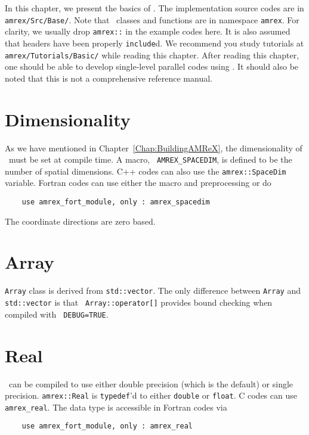 In this chapter, we present the basics of \amrex.  The implementation
source codes are in {\tt amrex/Src/Base/}.  Note that \amrex\ classes
and functions are in namespace {\tt amrex}.  For clarity, we usually
drop {\tt amrex::} in the example codes here.  It is also assumed that
headers have been properly {\tt include}d.  We recommend you study
tutorials at {\tt amrex/Tutorials/Basic/} while reading this chapter.
After reading this chapter, one should be able to develop single-level
parallel codes using \amrex.  It should also be noted that this is not
a comprehensive reference manual.

\section{Dimensionality}
\label{sec:basics:dim}

As we have mentioned in Chapter~\ref{Chap:BuildingAMReX}, the
dimensionality of \amrex\ must be set at compile time.  A macro, {\tt
  AMREX\_SPACEDIM}, is defined to be the number of spatial
dimensions.  C++ codes can also use the {\tt amrex::SpaceDim}
variable.  Fortran codes can use either the macro and preprocessing or
do 
\begin{verbatim}
    use amrex_fort_module, only : amrex_spacedim
\end{verbatim}
The coordinate directions are zero based. 

\section{Array}

{\tt Array} class is derived from {\tt std::vector}.  The only
difference between {\tt Array} and {\tt std::vector} is that {\tt
  Array::operator[]} provides bound checking when compiled with {\tt
  DEBUG=TRUE}. 

\section{Real}

\amrex\ can be compiled to use either double precision (which is the
default) or single precision.  {\tt amrex::Real} is {\tt typedef}'d to
either {\tt double} or {\tt float}.  C codes can use {\tt
  amrex\_real}.  The data type is accessible in Fortran codes via
\begin{verbatim}
    use amrex_fort_module, only : amrex_real
\end{verbatim}

